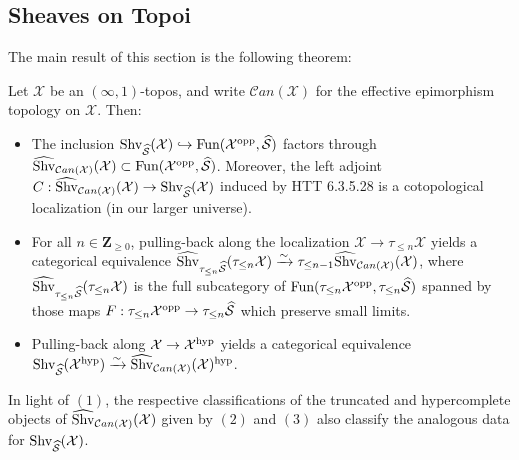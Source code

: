 \documentclass[10pt]{article}
\newcommand{\mS}{\mathcal S}
\newcommand{\C}{\mathcal C}
\newcommand{\cX}{\mathcal{X}}
\newcommand{\ZZ}{\mathbb{Z}}
\def\ZZ{{\mathbf Z}}
\theoremstyle{witharg}
\theoremstyle{witharg}
\theoremstyle{witharg2}
\begin{document}
\subsection{Sheaves on Topoi}\label{Sheaves on Topoi Subsection}

The main result of this section is the following theorem:

\begin{theorem}{}\label{Sheaves on Topoi Result}

     Let $\cX$ be an $(\infty,1)$-topos, and write $\C an(\cX)$ for the effective epimorphism topology on $\cX$. Then:


     \begin{itemize}

         \item [$(1)$] The inclusion $\textnormal{Shv}_{\widehat{\mS}}(\cX)\hookrightarrow \textnormal{Fun}(\cX^{\textnormal{opp}},\widehat{\mS})$ factors through $\widehat{\textnormal{Shv}}_{\C an(\cX)}(\cX)\subset \textnormal{Fun}(\cX^{\textnormal{opp}},\widehat{\mS})$. Moreover, the left adjoint $C:\widehat{\textnormal{Shv}}_{\C an(\cX)}(\cX)\rightarrow \textnormal{Shv}_{\widehat{\mS}}(\cX)$ induced by HTT 6.3.5.28 is a cotopological localization (in our larger universe).

         \item [$(2)$] For all $n\in \ZZ_{\geq 0}$, pulling-back along the localization $\cX\rightarrow \tau_{\leq n}\cX$ yields a categorical equivalence $\widehat{\textnormal{Shv}}_{\tau_{\leq n}\widehat{\mS}}(\tau_{\leq n}\cX)\xrightarrow{\sim} \tau_{\leq n-1}\widehat{\textnormal{Shv}}_{\C an(\cX)}(\cX)$, where $\widehat{\textnormal{Shv}}_{\tau_{\leq n}\widehat{\mS}}(\tau_{\leq n}\cX)$ is the full subcategory of $\textnormal{Fun}(\tau_{\leq n}\cX^{\textnormal{opp}},\tau_{\leq n}\widehat{\mS})$ spanned by those maps $F:\tau_{\leq n}\cX^{\textnormal{opp}}\rightarrow \tau_{\leq n}\widehat{\mS}$ which preserve small limits.


         \item [$(3)$] Pulling-back along $\cX\rightarrow \cX^{\textnormal{hyp}}$ yields a categorical equivalence $\textnormal{Shv}_{\widehat{\mS}}(\cX^{\textnormal{hyp}})\xrightarrow{\sim} \widehat{\textnormal{Shv}}_{\C an(\cX)}(\cX)^{\textnormal{hyp}}$.
         
     \end{itemize}
    
\end{theorem}

\begin{remark}{}

 In light of $(1)$, the respective classifications of the truncated and hypercomplete objects of $\widehat{\textnormal{Shv}}_{\C an(\cX)}(\cX)$ given by $(2)$ and $(3)$ also classify the analogous data for $\textnormal{Shv}_{\widehat{\mS}}(\cX)$.
    
\end{remark}
\end{document}
